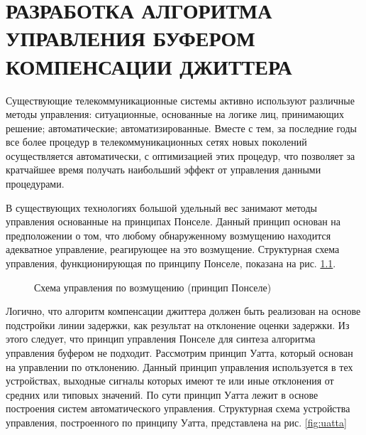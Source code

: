 \chapter{РАЗРАБОТКА АЛГОРИТМА УПРАВЛЕНИЯ БУФЕРОМ КОМПЕНСАЦИИ ДЖИТТЕРА} \label{chapt:man}

Существующие телекоммуникационные системы активно используют различные методы управления: ситуационные, основанные на логике лиц, принимающих решение; автоматические; автоматизированные.
Вместе с тем, за последние годы все более процедур в телекоммуникационных сетях новых поколений осуществляется автоматически, с оптимизацией этих процедур, что позволяет за кратчайшее время получать наибольший эффект от управления данными процедурами.

В существующих технологиях большой удельный вес занимают методы управления основанные на принципах Понселе. Данный принцип основан на предположении о том, что любому обнаруженному возмущению находится адекватное управление, реагирующее на это возмущение.
Структурная схема управления, функционирующая по принципу Понселе, показана на рис. \ref{fig:ponsele}.


\begin{figure}[!h]

\centering
{} 
\caption{Схема управления по возмущению (принцип Понселе)}
\label{fig:ponsele}
\end{figure}

Логично, что алгоритм компенсации джиттера должен быть реализован на основе подстройки линии задержки, как результат на отклонение оценки задержки. 
Из этого следует, что принцип управления Понселе для синтеза алгоритма управления буфером не подходит. 
Рассмотрим принцип Уатта, который основан на управлении по отклонению.
Данный принцип управления используется в тех устройствах, выходные сигналы которых имеют те или иные отклонения от средних  или типовых значений.
По сути принцип Уатта лежит в основе построения систем автоматического управления. Структурная схема устройства управления, построенного по принципу Уатта, представлена на рис. \ref{fig:uatta}


